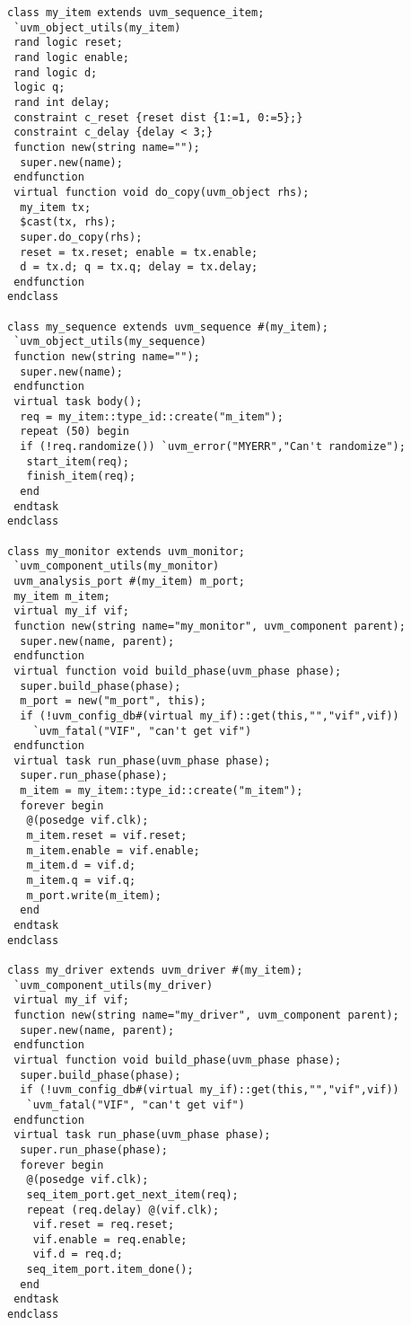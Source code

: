 \documentclass[conference]{IEEEtran}
\begin{document}
\begin{lstlisting}
class my_item extends uvm_sequence_item;
 `uvm_object_utils(my_item)
 rand logic reset;
 rand logic enable;
 rand logic d;
 logic q;
 rand int delay;
 constraint c_reset {reset dist {1:=1, 0:=5};}  
 constraint c_delay {delay < 3;}
 function new(string name="");
  super.new(name);
 endfunction
 virtual function void do_copy(uvm_object rhs);
  my_item tx;
  $cast(tx, rhs);
  super.do_copy(rhs);
  reset = tx.reset; enable = tx.enable;
  d = tx.d; q = tx.q; delay = tx.delay;
 endfunction
endclass

class my_sequence extends uvm_sequence #(my_item);
 `uvm_object_utils(my_sequence)
 function new(string name="");
  super.new(name);
 endfunction
 virtual task body();
  req = my_item::type_id::create("m_item");
  repeat (50) begin
  if (!req.randomize()) `uvm_error("MYERR","Can't randomize");
   start_item(req);
   finish_item(req);
  end
 endtask
endclass

class my_monitor extends uvm_monitor;
 `uvm_component_utils(my_monitor)
 uvm_analysis_port #(my_item) m_port;
 my_item m_item;
 virtual my_if vif;
 function new(string name="my_monitor", uvm_component parent);
  super.new(name, parent);
 endfunction
 virtual function void build_phase(uvm_phase phase);
  super.build_phase(phase);
  m_port = new("m_port", this);
  if (!uvm_config_db#(virtual my_if)::get(this,"","vif",vif))
    `uvm_fatal("VIF", "can't get vif")
 endfunction
 virtual task run_phase(uvm_phase phase);
  super.run_phase(phase);
  m_item = my_item::type_id::create("m_item");
  forever begin
   @(posedge vif.clk);
   m_item.reset = vif.reset; 
   m_item.enable = vif.enable;
   m_item.d = vif.d; 
   m_item.q = vif.q;
   m_port.write(m_item);
  end
 endtask
endclass

class my_driver extends uvm_driver #(my_item);
 `uvm_component_utils(my_driver)
 virtual my_if vif;
 function new(string name="my_driver", uvm_component parent);
  super.new(name, parent);
 endfunction
 virtual function void build_phase(uvm_phase phase);
  super.build_phase(phase);
  if (!uvm_config_db#(virtual my_if)::get(this,"","vif",vif))
   `uvm_fatal("VIF", "can't get vif")
 endfunction
 virtual task run_phase(uvm_phase phase);
  super.run_phase(phase);
  forever begin
   @(posedge vif.clk);
   seq_item_port.get_next_item(req);
   repeat (req.delay) @(vif.clk);
    vif.reset = req.reset; 
    vif.enable = req.enable; 
    vif.d = req.d; 
   seq_item_port.item_done();
  end
 endtask
endclass
\end{lstlisting}
\end{document}
